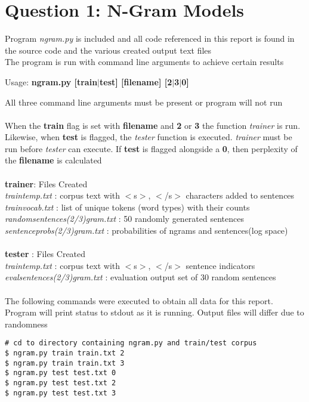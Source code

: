 \documentclass{article}
\begin{document}
\part{Question 1: N-Gram Models}
Program \textit{ngram.py} is included and all code referenced in this report is found in the source code and the various created output text files
\\
The program is run with command line arguments to achieve certain results
\begin{center}
Usage: \textbf{ngram.py [train$\mid$test] [filename] [2$\mid$3$\mid$0]}
\end{center}
All three command line arguments must be present or program will not run
\\\\
When the \textbf{train} flag is set with \textbf{filename} and \textbf{2} or \textbf{3} the function \textit{trainer} is run. Likewise, when \textbf{test} is flagged, the \textit{tester} function is executed. \textit{trainer} must be run before \textit{tester} can execute. If \textbf{test} is flagged alongside a \textbf{0}, then perplexity of the \textbf{filename} is calculated
\\
\\
\textbf{trainer}: Files Created
\\
\textit{traintemp.txt} : corpus text with $<$s$>$, $<$/s$>$ characters added to sentences\\
\textit{trainvocab.txt} : list of unique tokens (word types) with their counts\\
\textit{randomsentences(2/3)gram.txt} : 50 randomly generated sentences\\
\textit{sentenceprobs(2/3)gram.txt} : probabilities of ngrams and sentences(log space)\\
\\
\textbf{tester} : Files Created
\\
\textit{traintemp.txt} : corpus text with $<$s$>$, $<$/s$>$ sentence indicators\\
\textit{evalsentences(2/3)gram.txt} : evaluation output set of 30 random sentences\\
\\
The following commands were executed to obtain all data for this report. Program will print status to stdout as it is running. Output files will differ due to randomness
\begin{verbatim}
# cd to directory containing ngram.py and train/test corpus
$ ngram.py train train.txt 2
$ ngram.py train train.txt 3
$ ngram.py test test.txt 0
$ ngram.py test test.txt 2
$ ngram.py test test.txt 3
\end{verbatim}
\end{document}
